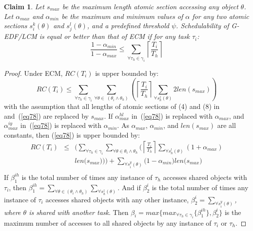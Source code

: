 \documentclass[conference]{IEEEtran}
\newtheorem{clm}{Claim}
\begin{document}
\begin{clm}\label{lcm versus ecm}
Let $s_{max}$ be the maximum length atomic section accessing any object $\theta$. Let $\alpha_{max}$ and $\alpha_{min}$ be the maximum and minimum values of $\alpha$ for any two atomic sections $s_i^k(\theta)$ and $s_j^l(\theta)$, and a predefined threshold $\psi$.  Schedulability of G-EDF/LCM is equal or better than that of  ECM if for any task $\tau_i$:
\begin{equation}
\frac{1-\alpha_{min}}{1-\alpha_{max}} \le \sum_{\forall \tau_h \in \gamma_i}\left\lceil\frac{T_i}{T_h}\right\rceil
\label{edf-lcm-ecm}\end{equation}
\end{clm}
\begin{proof}
Under ECM, $RC(T_{i})$ is upper bounded by:
\begin{equation}
RC(T_{i})\le\sum_{\forall \tau_{h}\in\gamma_{i}}\sum_{\forall \theta\in\ (\theta_{i}\wedge\theta_{h})}\left(\left\lceil\frac{T_{i}}{T_{h}}\right\rceil\sum_{\forall s_{h}^{z}(\theta)}2len(s_{max})\right)\label{eq61}\end{equation}
with the assumption that all lengths of atomic sections of (4) and (8) in~\cite{stmconcurrencycontrol:emsoft11} and~(\ref{eq78}) are replaced by $s_{max}$.
If $\alpha_{max}^{hl}$ in~(\ref{eq78}) is replaced with $\alpha_{max}$, and $\alpha_{max}^{iy}$ in~(\ref{eq78}) is replaced with $\alpha_{min}$. As $\alpha_{max}$, $\alpha_{min}$, and $len(s_{max})$ are all constants, then (\ref{eq78}) is upper bounded by:
\begin{eqnarray}
RC(T_i) & \le & \Bigg(\sum_{\forall \tau_h \in \gamma_i}\sum_{\forall\theta \in \theta_i \wedge \theta_h}\Bigg(\left\lceil\frac{T_{i}}{T_{h}}\right\rceil\sum_{\forall s_{h}^{l}(\theta)}\left(1+\alpha_{max}\right)\nonumber\\
& & len\Big(s_{max}\Big)\Bigg)\Bigg)
 +  \sum_{\forall s_{i}^{y}(\theta)}\Big(1-\alpha_{min}\Big)len\Big(s_{max}\Big)\nonumber\\ 
\label{eq101}\end{eqnarray}
%
If $\beta_1^{ih}$ is the total number of times any instance of $\tau_h$ accesses shared objects with $\tau_i$, then $\beta_1^{ih}=\sum_{\forall \theta\in(\theta_{i}\wedge\theta_{h})}\sum_{\forall s_{h}^{z}(\theta)}$. And if $\beta_2^i$ is the total number of times any instance of $\tau_i$ accesses shared objects with any other instance,   $\beta_2^i=\sum_{\forall s_{i}^{y}(\theta)}$\textit{, where $\theta$ is shared with another task}. Then $\beta_{i}=max\{max_{\forall \tau_h \in \gamma_i}\{\beta_1^{ih}\},\beta_2^i\}$ is the maximum number of accesses to all shared objects by any instance of $\tau_{i}$ or $\tau_{h}$. 

\end{proof}
\end{document}
